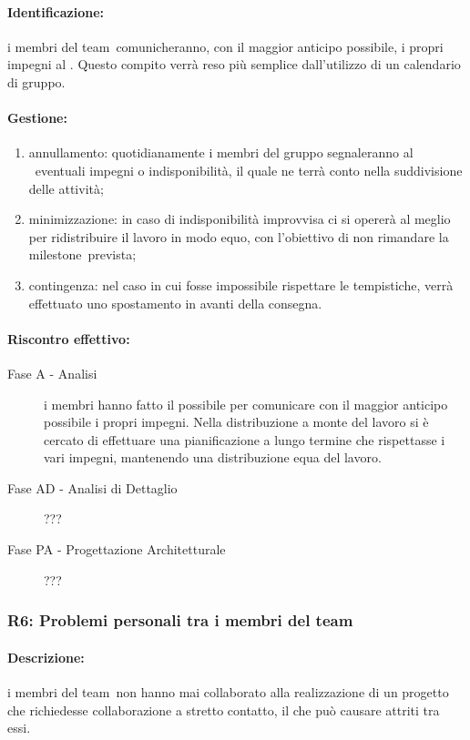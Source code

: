 \documentclass[../PianoProgetto.tex]{subfiles}
\begin{document}
	\paragraph*{Identificazione:} i membri del team\g\ comunicheranno, con il maggior anticipo possibile, i propri impegni al \responsabilediprogetto . Questo compito verrà reso più semplice dall'utilizzo di un calendario di gruppo. 
	
	\paragraph*{Gestione:}
	\begin{enumerate}
		\item annullamento: quotidianamente i membri del gruppo segnaleranno al \responsabilediprogetto\ eventuali impegni o indisponibilità, il quale ne terrà conto nella suddivisione delle attività;
		\item minimizzazione: in caso di indisponibilità improvvisa ci si opererà al meglio per ridistribuire il lavoro in modo equo, con l'obiettivo di non rimandare la milestone\g\ prevista;
		\item contingenza: nel caso in cui fosse impossibile rispettare le tempistiche, verrà effettuato uno spostamento in avanti della consegna.
	\end{enumerate}
			
	\paragraph*{Riscontro effettivo:}
		\begin{description}
			\item[Fase A - Analisi] i membri hanno fatto il possibile per comunicare con il maggior anticipo possibile i propri impegni. Nella distribuzione a monte del lavoro si è cercato di effettuare una pianificazione a lungo termine che rispettasse i vari impegni, mantenendo una distribuzione equa del lavoro.
			\item[Fase AD - Analisi di Dettaglio] ???
			\item[Fase PA - Progettazione Architetturale] ???
		\end{description}
	
\subsubsection{R6: Problemi personali tra i membri del team}

	\paragraph*{Descrizione:} i membri del team\g\ non hanno mai collaborato alla realizzazione di un progetto che richiedesse collaborazione a stretto contatto, il che può causare attriti tra essi.
	
\end{document}
